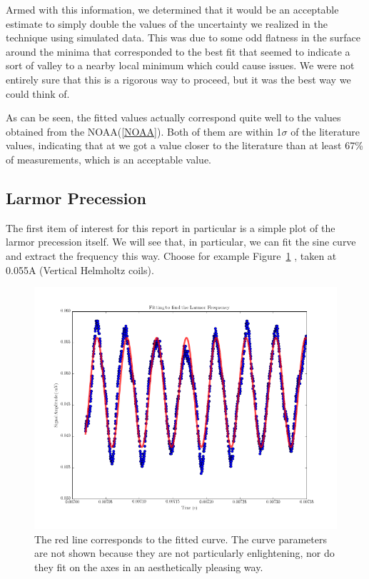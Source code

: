 \documentclass{article}
\begin{document}
    \hspace{.25cm}

    Armed with this information, we determined that it would be an acceptable estimate to simply double the values of the uncertainty we realized in the technique using simulated data.  This was due to some odd flatness in the surface around the minima that corresponded to the best fit that seemed to indicate a sort of valley to a nearby local minimum which could cause issues.  We were not entirely sure that this is a rigorous way to proceed, but it was the best way we could think of.

    \hspace{.25cm}

    As can be seen, the fitted values actually correspond quite well to the values obtained from the NOAA(\ref{NOAA}).  Both of them are within 1$\sigma$ of the literature values, indicating that at we got a value closer to the literature than at least 67\% of measurements, which is an acceptable value.

  \subsection{Larmor Precession}
    The first item of interest for this report in particular is a simple plot of the larmor precession itself.  We will see that, in particular, we can fit the sine curve and extract the frequency this way.  Choose for example Figure~\ref{sinwave} , taken at 0.055A (Vertical Helmholtz coils).

    \begin{figure}[!htb]
      \centering
      \includegraphics[scale=.45]{../plots/(larmor_y0_055A).png}
      \caption{The red line corresponds to the fitted curve.  The curve parameters are not shown because they are not particularly enlightening, nor do they fit on the axes in an aesthetically pleasing way.}
      \label{sinwave}
    \end{figure}
\end{document}
